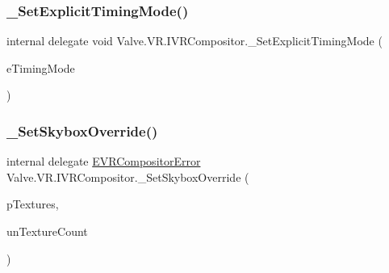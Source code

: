 \mbox{\label{struct_valve_1_1_v_r_1_1_i_v_r_compositor_acec020845b093a0661c4f86e03fb4390}} 
\subsubsection{\texorpdfstring{\_SetExplicitTimingMode()}{\_SetExplicitTimingMode()}}
{\footnotesize\ttfamily internal delegate void Valve.\+V\+R.\+I\+V\+R\+Compositor.\+\_\+\+Set\+Explicit\+Timing\+Mode (\begin{DoxyParamCaption}\item[{\mbox{\hyperlink{namespace_valve_1_1_v_r_a9fcb102e844540a2246475933f824463}{E\+V\+R\+Compositor\+Timing\+Mode}}}]{e\+Timing\+Mode }\end{DoxyParamCaption})}

\mbox{\label{struct_valve_1_1_v_r_1_1_i_v_r_compositor_a6d4862a15d14c6786ea787b59a6d08c1}} 
\subsubsection{\texorpdfstring{\_SetSkyboxOverride()}{\_SetSkyboxOverride()}}
{\footnotesize\ttfamily internal delegate \mbox{\hyperlink{namespace_valve_1_1_v_r_ac34ee1034fda668ccd45f57676ded81b}{E\+V\+R\+Compositor\+Error}} Valve.\+V\+R.\+I\+V\+R\+Compositor.\+\_\+\+Set\+Skybox\+Override (\begin{DoxyParamCaption}\item[{\mbox{[}\+In, Out\mbox{]} \mbox{\hyperlink{struct_valve_1_1_v_r_1_1_texture__t}{Texture\+\_\+t}} \mbox{[}$\,$\mbox{]}}]{p\+Textures,  }\item[{uint}]{un\+Texture\+Count }\end{DoxyParamCaption})}

\mbox{\label{struct_valve_1_1_v_r_1_1_i_v_r_compositor_a8f3a63140b76c144825aef005d57b9a7}} 
